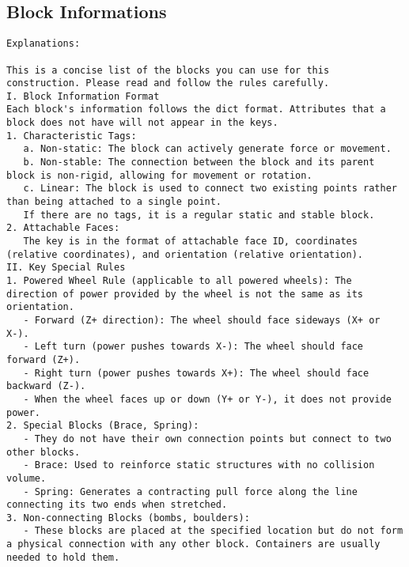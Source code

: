 \subsection{Block Informations}
\begin{lstlisting}
Explanations:

This is a concise list of the blocks you can use for this construction. Please read and follow the rules carefully.
I. Block Information Format
Each block's information follows the dict format. Attributes that a block does not have will not appear in the keys.
1. Characteristic Tags:
   a. Non-static: The block can actively generate force or movement.
   b. Non-stable: The connection between the block and its parent block is non-rigid, allowing for movement or rotation.
   c. Linear: The block is used to connect two existing points rather than being attached to a single point.
   If there are no tags, it is a regular static and stable block.
2. Attachable Faces:
   The key is in the format of attachable face ID, coordinates (relative coordinates), and orientation (relative orientation).
II. Key Special Rules
1. Powered Wheel Rule (applicable to all powered wheels): The direction of power provided by the wheel is not the same as its orientation.
   - Forward (Z+ direction): The wheel should face sideways (X+ or X-).
   - Left turn (power pushes towards X-): The wheel should face forward (Z+).
   - Right turn (power pushes towards X+): The wheel should face backward (Z-).
   - When the wheel faces up or down (Y+ or Y-), it does not provide power.
2. Special Blocks (Brace, Spring):
   - They do not have their own connection points but connect to two other blocks.
   - Brace: Used to reinforce static structures with no collision volume.
   - Spring: Generates a contracting pull force along the line connecting its two ends when stretched.
3. Non-connecting Blocks (bombs, boulders):
   - These blocks are placed at the specified location but do not form a physical connection with any other block. Containers are usually needed to hold them.


\end{lstlisting}
